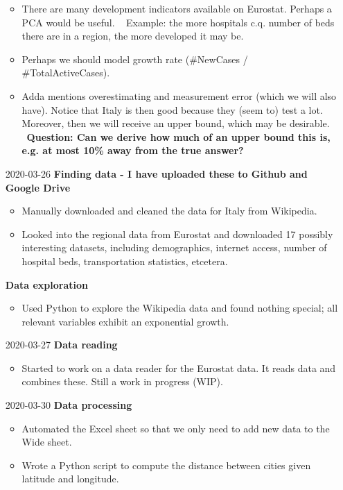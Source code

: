 \documentclass{article}
\begin{document}
\begin{itemize}
\begin{itemize}
			\item There are many development indicators available on Eurostat. Perhaps a PCA would be useful.
				\subitem \textbullet~ Example: the more hospitals c.q. number of beds there are in a region, the more developed it may be.
			\item Perhaps we should model growth rate (\#NewCases / \#TotalActiveCases).
			\item Adda mentions overestimating and measurement error (which we will also have). Notice that Italy is then good because they (seem to) test a lot. Moreover, then we will receive an upper bound, which may be desirable.
				\subitem \textbullet~\textbf{Question: Can we derive how much of an upper bound this is, e.g. at most 10\% away from the true answer?}
		\end{itemize}
	
	\item[2020-03-26]
	\textbf{Finding data - I have uploaded these to Github and Google Drive}
		\begin{itemize}
			\item Manually downloaded and cleaned the data for Italy from Wikipedia.
			\item Looked into the regional data from Eurostat and downloaded 17 possibly interesting datasets, including demographics, internet access, number of hospital beds, transportation statistics, etcetera.
		\end{itemize}
	
	\textbf{Data exploration}
		\begin{itemize}
			\item Used Python to explore the Wikipedia data and found nothing special; all relevant variables exhibit an exponential growth.
		\end{itemize} 
	
	\item[2020-03-27]
	\textbf{Data reading}
		\begin{itemize}
			\item Started to work on a data reader for the Eurostat data. It reads data and combines these. Still a work in progress (WIP).
		\end{itemize}
	
	\item[2020-03-30]
	\textbf{Data processing}
		\begin{itemize}
			\item Automated the Excel sheet so that we only need to add new data to the Wide sheet.
			\item Wrote a Python script to compute the distance between cities given latitude and longitude.
		\end{itemize}


\end{itemize}
\end{document}
